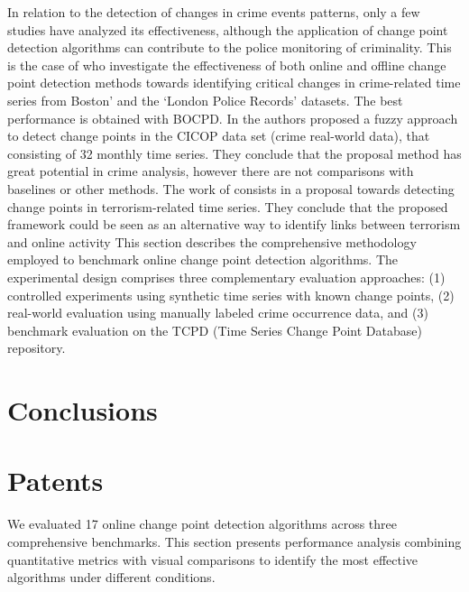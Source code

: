 \documentclass[journal,article,submit,pdftex,moreauthors]{Definitions/mdpi}
\begin{document}
In relation to the detection of changes in crime events patterns, only a few studies have analyzed its effectiveness, although the application of change point detection algorithms can contribute to the police monitoring of criminality. This is the case of \cite{konstantinou2023trend} who investigate the effectiveness of both online and offline change point detection methods towards identifying critical changes in crime-related time series from Boston’ and the ‘London Police Records’ datasets. The best performance is obtained with BOCPD. In \cite{albertetti2016change} the authors proposed a fuzzy approach to detect change points in the CICOP data set (crime real-world data), that consisting of 32 monthly time series. They conclude that the proposal method has great potential in crime analysis, however there are not comparisons with baselines or other methods.  The work of \cite{theodosiadou2021change} consists in a proposal towards detecting change points in terrorism-related time series. They conclude that the proposed framework could be seen as an alternative way to identify links between terrorism and online activity
This section describes the comprehensive methodology employed to benchmark online change point detection algorithms. The experimental design comprises three complementary evaluation approaches: (1) controlled experiments using synthetic time series with known change points, (2) real-world evaluation using manually labeled crime occurrence data, and (3) benchmark evaluation on the TCPD (Time Series Change Point Database) repository.







\section{Conclusions}



\section{Patents}

We evaluated 17 online change point detection algorithms across three comprehensive benchmarks. This section presents performance analysis combining quantitative metrics with visual comparisons to identify the most effective algorithms under different conditions.
\end{document}
